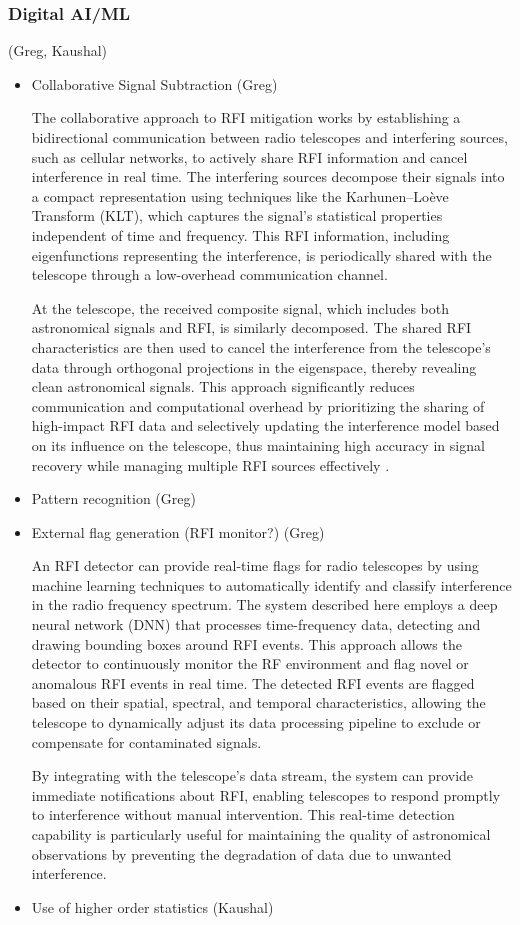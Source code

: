 \subsubsection{Digital AI/ML} (Greg, Kaushal)
\begin{itemize}
\item Collaborative Signal Subtraction (Greg)

The collaborative approach to RFI mitigation works by establishing a bidirectional communication between radio telescopes and interfering sources, such as cellular networks, to actively share RFI information and cancel interference in real time. The interfering sources decompose their signals into a compact representation using techniques like the Karhunen–Loève Transform (KLT), which captures the signal's statistical properties independent of time and frequency. This RFI information, including eigenfunctions representing the interference, is periodically shared with the telescope through a low-overhead communication channel.

At the telescope, the received composite signal, which includes both astronomical signals and RFI, is similarly decomposed. The shared RFI characteristics are then used to cancel the interference from the telescope’s data through orthogonal projections in the eigenspace, thereby revealing clean astronomical signals. This approach significantly reduces communication and computational overhead by prioritizing the sharing of high-impact RFI data and selectively updating the interference model based on its influence on the telescope, thus maintaining high accuracy in signal recovery while managing multiple RFI sources effectively \cite{chakraborty2023collaboration,chakraborty2024low}.

\item Pattern recognition (Greg)
\item External flag generation (RFI monitor?) (Greg)

An RFI detector can provide real-time flags for radio telescopes by using machine learning techniques to automatically identify and classify interference in the radio frequency spectrum. The system described here \cite{9111666} employs a deep neural network (DNN) that processes time-frequency data, detecting and drawing bounding boxes around RFI events. This approach allows the detector to continuously monitor the RF environment and flag novel or anomalous RFI events in real time. The detected RFI events are flagged based on their spatial, spectral, and temporal characteristics, allowing the telescope to dynamically adjust its data processing pipeline to exclude or compensate for contaminated signals.

By integrating with the telescope’s data stream, the system can provide immediate notifications about RFI, enabling telescopes to respond promptly to interference without manual intervention. This real-time detection capability is particularly useful for maintaining the quality of astronomical observations by preventing the degradation of data due to unwanted interference.

\item Use of higher order statistics (Kaushal)
\end{itemize}